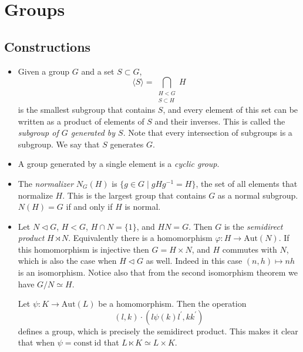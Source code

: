 \documentclass{article}
\begin{document}
\section{Groups}
\subsection{Constructions}
  \begin{itemize}
    \item{
      Given a group $G$ and a set $S \subset G$,
      $$
      \langle S \rangle = \bigcap_{\substack{H < G \\ S \subset H}} H
      $$
      is the smallest subgroup that contains $S$, and every element of
      this set can be written as a product of elements of $S$ and
      their inverses. This is called the \emph{subgroup of $G$
        generated by $S$}. Note that every intersection of subgroups
      is a subgroup. We say that $S$ generates $G$.
    }
    \item{
      A group generated by a single element is a \emph{cyclic group}.
    }
    \item{
      The \emph{normalizer} $N_G(H)$ is
      $\{ g \in G \mid g H g^{-1} = H \}$, the set of all elements
      that normalize $H$. This is the largest group that contains $G$
      as a normal subgroup. $N(H) = G$ if and only if $H$ is normal.
    }
    \item{
      Let $N \triangleleft G$, $H < G$, $H \cap N = \{ 1 \}$, and $HN
      = G$. Then $G$ is the \emph{semidirect product} $H \rtimes N$.
      Equivalently there is a homomorphism $\varphi : H \to
      \mathrm{Aut}(N)$. If this homomorphism is injective then $G = H
      \times N$, and $H$ commutes with $N$, which is also the case
      when $H \triangleleft G$ as well. Indeed in this case
      $(n, h) \mapsto nh$ is an isomorphism. Notice also that from the
      second isomorphism theorem we have $G / N \simeq H$.

      Let $\psi : K \to \mathrm{Aut}(L)$ be a homomorphism. Then the operation
      $$
      (l, k) \cdot (l \psi(k) l^\prime, k k^\prime)
      $$
      defines a group, which is precisely the semidirect product. This
      makes it clear that when $\psi = \mathrm{const}~\mathrm{id}$
      that $L \ltimes K \simeq L \times K$.

}
\end{itemize}
\end{document}
